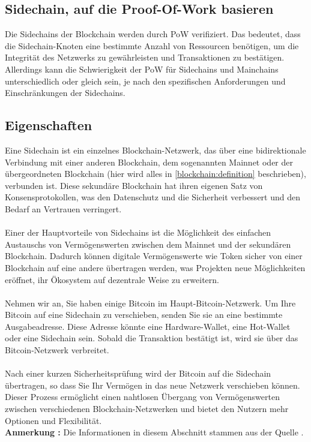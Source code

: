 \subsection{Sidechain, auf die Proof-Of-Work basieren}
Die Sidechains der Blockchain werden durch PoW verifiziert. Das bedeutet, dass die Sidechain-Knoten eine bestimmte Anzahl von Ressourcen benötigen, um die Integrität des Netzwerks zu gewährleisten und Transaktionen zu bestätigen. Allerdings kann die Schwierigkeit der PoW für Sidechains und Mainchains unterschiedlich oder gleich sein, je nach den spezifischen Anforderungen und Einschränkungen der Sidechains.
\subsection{Eigenschaften}
Eine Sidechain ist ein einzelnes Blockchain-Netzwerk, das über eine bidirektionale Verbindung mit einer anderen Blockchain, dem sogenannten Mainnet oder der übergeordneten Blockchain (hier wird alles in \cref{blockchain:definition} beschrieben), verbunden ist. Diese sekundäre Blockchain hat ihren eigenen Satz von Konsensprotokollen, was den Datenschutz und die Sicherheit verbessert und den Bedarf an Vertrauen verringert. \\\\
Einer der Hauptvorteile von Sidechains ist die Möglichkeit des einfachen Austauschs von Vermögenswerten zwischen dem Mainnet und der sekundären Blockchain. Dadurch können digitale Vermögenswerte wie Token sicher von einer Blockchain auf eine andere übertragen werden, was Projekten neue Möglichkeiten eröffnet, ihr Ökosystem auf dezentrale Weise zu erweitern. \\ \\
Nehmen wir an, Sie haben einige Bitcoin im Haupt-Bitcoin-Netzwerk. Um Ihre Bitcoin auf eine Sidechain zu verschieben, senden Sie sie an eine bestimmte Ausgabeadresse. Diese Adresse könnte eine Hardware-Wallet, eine Hot-Wallet oder eine Sidechain sein. Sobald die Transaktion bestätigt ist, wird sie über das Bitcoin-Netzwerk verbreitet. \\ \\
Nach einer kurzen Sicherheitsprüfung wird der Bitcoin auf die Sidechain übertragen, so dass Sie Ihr Vermögen in das neue Netzwerk verschieben können. Dieser Prozess ermöglicht einen nahtlosen Übergang von Vermögenswerten zwischen verschiedenen Blockchain-Netzwerken und bietet den Nutzern mehr Optionen und Flexibilität.\\
\textbf{Anmerkung : } Die Informationen in diesem Abschnitt stammen aus der Quelle \cite{coin_desk}.


